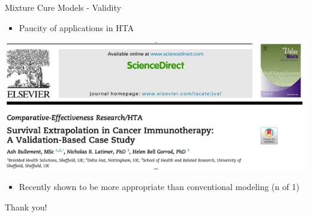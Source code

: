 \documentclass[
  ignorenonframetext,
]{beamer}
\providecommand{\tightlist}{%
  \setlength{\itemsep}{0pt}\setlength{\parskip}{0pt}}
\begin{document}
\begin{frame}{Mixture Cure Models - Validity}
\protect\hypertarget{mixture-cure-models---validity}{}

\begin{itemize}
\tightlist
\item
  Paucity of applications in HTA
\end{itemize}

\includegraphics[width=1\linewidth]{figures/latimercure}

\begin{itemize}
\tightlist
\item
  Recently shown to be more appropriate than conventional modeling (n of
  1)
\end{itemize}

\end{frame}

\begin{frame}{Thank you!}
\protect\hypertarget{thank-you}{}

\end{frame}
\end{document}

